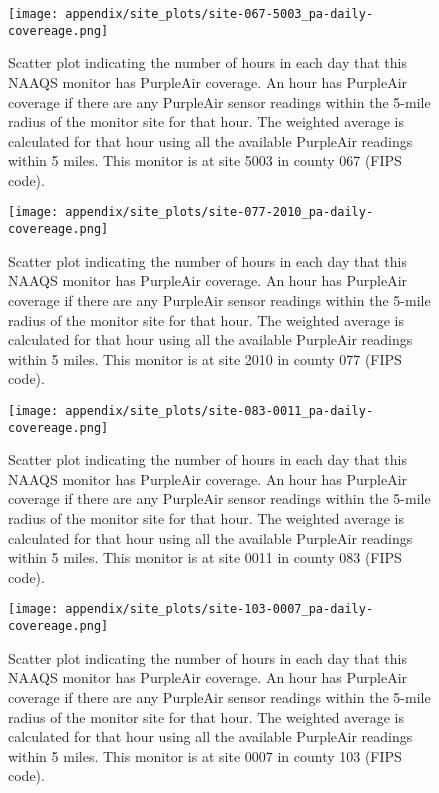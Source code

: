 \begin{figure}
\centering
\texttt{[image: appendix/site\_plots/site-067-5003\_pa-daily-covereage.png]}
\caption{Scatter plot indicating the number of hours in each day that this NAAQS monitor has PurpleAir coverage. An hour has PurpleAir coverage if there are any PurpleAir sensor readings within the 5-mile radius of the monitor site for that hour. The weighted average is calculated for that hour using all the available PurpleAir readings within 5 miles. This monitor is at site 5003 in county 067 (FIPS code).}
\label{fig:hourly_coverage_067-5003}
\end{figure}
\begin{figure}
\centering
\texttt{[image: appendix/site\_plots/site-077-2010\_pa-daily-covereage.png]}
\caption{Scatter plot indicating the number of hours in each day that this NAAQS monitor has PurpleAir coverage. An hour has PurpleAir coverage if there are any PurpleAir sensor readings within the 5-mile radius of the monitor site for that hour. The weighted average is calculated for that hour using all the available PurpleAir readings within 5 miles. This monitor is at site 2010 in county 077 (FIPS code).}
\label{fig:hourly_coverage_077-2010}
\end{figure}
\begin{figure}
\centering
\texttt{[image: appendix/site\_plots/site-083-0011\_pa-daily-covereage.png]}
\caption{Scatter plot indicating the number of hours in each day that this NAAQS monitor has PurpleAir coverage. An hour has PurpleAir coverage if there are any PurpleAir sensor readings within the 5-mile radius of the monitor site for that hour. The weighted average is calculated for that hour using all the available PurpleAir readings within 5 miles. This monitor is at site 0011 in county 083 (FIPS code).}
\label{fig:hourly_coverage_083-0011}
\end{figure}
\begin{figure}
\centering
\texttt{[image: appendix/site\_plots/site-103-0007\_pa-daily-covereage.png]}
\caption{Scatter plot indicating the number of hours in each day that this NAAQS monitor has PurpleAir coverage. An hour has PurpleAir coverage if there are any PurpleAir sensor readings within the 5-mile radius of the monitor site for that hour. The weighted average is calculated for that hour using all the available PurpleAir readings within 5 miles. This monitor is at site 0007 in county 103 (FIPS code).}
\label{fig:hourly_coverage_103-0007}
\end{figure}
